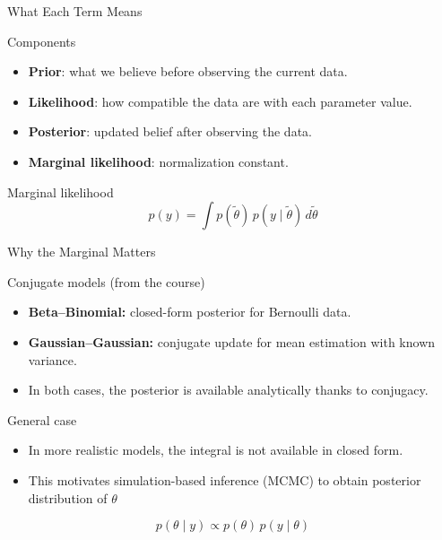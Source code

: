 \documentclass[aspectratio=169,11pt]{beamer}
\begin{document}
\begin{frame}{What Each Term Means}
  \begin{block}{Components}
  \begin{itemize}
    \item \textbf{Prior}: what we believe before observing the current data.
    \item \textbf{Likelihood}: how compatible the data are with each parameter value.
    \item \textbf{Posterior}: updated belief after observing the data.
    \item \textbf{Marginal likelihood}: normalization constant.
  \end{itemize}
  \end{block}

  \begin{exampleblock}{Marginal likelihood}
  \[
  p(y)=\int p(\tilde{\theta})\,p(y \mid \tilde{\theta})\,d\tilde{\theta}
  \]
  \end{exampleblock}
\end{frame}

\begin{frame}{Why the Marginal Matters}
  \begin{block}{Conjugate models (from the course)}
  \begin{itemize}
    \item \textbf{Beta--Binomial:} closed-form posterior for Bernoulli data.
    \item \textbf{Gaussian--Gaussian:} conjugate update for mean estimation with known variance.
    \item In both cases, the posterior is available analytically thanks to conjugacy.
  \end{itemize}
  \end{block}

  \begin{block}{General case}
  \begin{itemize}
    \item In more realistic models, the integral is not available in closed form.
    \item This motivates simulation-based inference (MCMC) to obtain posterior distribution of $\theta$
  \end{itemize}
  \end{block}
   \vspace{-0.3cm}

  \[
  p(\theta \mid y) \propto p(\theta)\,p(y \mid \theta)
  \]
\end{frame}
\end{document}
